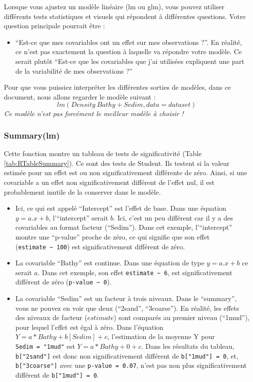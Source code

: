 \documentclass[french,a4paper]{article}
\providecommand{\tightlist}{%
  \setlength{\itemsep}{0pt}\setlength{\parskip}{0pt}}
\begin{document}
Lorsque vous ajustez un modèle linéaire (lm ou glm), vous pouvez
utiliser différents tests statistiques et visuels qui répondent à
différentes questions. Votre question principale pourrait être :

\begin{itemize}
\tightlist
\item
  ``Est-ce que mes covariables ont un effet sur mes observations ?''. En
  réalité, ce n'est pas exactement la question à laquelle va répondre
  votre modèle. Ce serait plutôt ``Est-ce que les covariables que j'ai
  utilisées expliquent une part de la variabilité de mes observations
  ?''
\end{itemize}

Pour que vous puissiez interpréter les différentes sorties de modèles,
dans ce document, nous allons regarder le modèle suivant :
\[lm(Density ~ Bathy + Sedim, data = dataset)\] \emph{Ce modèle n'est
pas forcément le meilleur modèle à choisir !}

\subsubsection{Summary(lm)}\label{summarylm}

Cette fonction montre un tableau de tests de significativité (Table
\ref{tab:RTableSummary}). Ce sont des tests de Student. Ils testent si
la valeur estimée pour un effet est ou non significativement différente
de zéro. Ainsi, si une covariable a un effet non significativement
différent de l'effet nul, il est probablement inutile de la conserver
dans le modèle.

\begin{itemize}
\tightlist
\item
  Ici, ce qui est appelé ``Intercept'' est l'effet de base. Dans une
  équation \(y = a.x + b\), l'``intercept'' serait \(b\). Ici, c'est un
  peu différent car il y a des covariables au format facteur
  (``Sedim''). Dans cet exemple, l'``intercept'' montre une ``p-value''
  proche de zéro, ce qui signifie que son effet
  (\texttt{estimate\ \textasciitilde{}\ 100}) est significativement
  différent de zéro.
\item
  La covariable ``Bathy'' est continue. Dans une équation de type
  \(y = a.x + b\) ce serait \(a\). Dans cet exemple, son effet
  \texttt{estimate\ \textasciitilde{}\ 6}, est significativement
  différent de zéro (\texttt{p-value\ \textasciitilde{}\ 0}).
\item
  La covariable ``Sedim'' est un facteur à trois niveaux. Dans le
  ``summary'', vous ne pouvez en voir que deux (``2sand'', ``3coarse'').
  En réalité, les effets des niveaux de facteur (\(estimate\)) sont
  comparés au premier niveau (``1mud''), pour lequel l'effet est égal à
  zéro. Dans l'équation \(Y = a*Bathy + b[Sedim] + c\), l'estimation de
  la moyenne Y pour \texttt{Sedim\ =\ "1mud"} est
  \(Y = a*Bathy + 0 + c\). Dans les résultats du tableau,
  \texttt{b{[}"2sand"{]}} est donc non significativement différent de
  \texttt{b{[}"1mud"{]}\ =\ 0}, et, \texttt{b{[}"3coarse"{]}} avec une
  \texttt{p-value\ =\ 0.07}, n'est pas non plus significativement
  différent de \texttt{b{[}"1mud"{]}\ =\ 0}.
\end{itemize}
\end{document}
